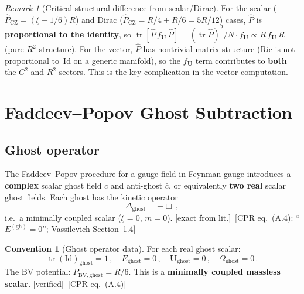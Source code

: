 \documentclass[12pt,a4paper]{article}
\theoremstyle{definition}
\newtheorem{convention}[proposition]{Convention}
\theoremstyle{remark}
\newtheorem{remark}[proposition]{Remark}
\newcommand{\tr}{\operatorname{tr}}
\newcommand{\Id}{\mathrm{Id}}
\newcommand{\fromlit}[1]{\textcolor{blue!70!black}{\textsf{[#1]}}}
\newcommand{\exactlit}{\textcolor{blue!60!black}{\textsf{[exact from lit.]}}}
\newcommand{\verified}{\textcolor{green!50!black}{\textsf{[verified]}}}
\begin{document}
\begin{remark}[Critical structural difference from scalar/Dirac]
\label{rem:matrix-hatP}
For the scalar ($\hat{P}_{\mathrm{CZ}} = (\xi+1/6)R$) and
Dirac ($\hat{P}_{\mathrm{CZ}} = R/4 + R/6 = 5R/12$) cases,
$\hat{P}$ is \textbf{proportional to the identity}, so
$\tr[\hat{P}\,f_{\mathbf{U}}\,\hat{P}] = (\tr\hat{P})^2/N \cdot
f_{\mathbf{U}} \propto R\,f_{\mathbf{U}}\,R$ (pure $R^2$ structure).
For the vector, $\hat{P}$ has nontrivial matrix structure
(Ric is not proportional to~$\Id$ on a generic manifold), so the
$f_{\mathbf{U}}$ term contributes to \textbf{both} the $C^2$ and
$R^2$ sectors.  This is the key complication in the vector computation.
\end{remark}


\section{Faddeev--Popov Ghost Subtraction}
\label{sec:ghost-subtraction}

\subsection{Ghost operator}

The Faddeev--Popov procedure for a gauge field in Feynman gauge
introduces a \textbf{complex} scalar ghost field $c$ and anti-ghost
$\bar{c}$, or equivalently \textbf{two real} scalar ghost fields.
Each ghost has the kinetic operator
\begin{equation}
  \Delta_{\mathrm{ghost}} = -\Box\,,
  \label{eq:ghost-operator}
\end{equation}
i.e.\ a minimally coupled scalar ($\xi = 0$, $m = 0$).
\exactlit\ \fromlit{CPR eq.~(A.4): ``$E^{(\mathrm{gh})} = 0$'';
Vassilevich Section~1.4}

\begin{convention}[Ghost operator data]
For each real ghost scalar:
\begin{equation}
  \tr(\Id)_{\mathrm{ghost}} = 1\,,\quad
  E_{\mathrm{ghost}} = 0\,,\quad
  \mathbf{U}_{\mathrm{ghost}} = 0\,,\quad
  \Omega_{\mathrm{ghost}} = 0\,.
  \label{eq:ghost-data}
\end{equation}
The BV potential: $P_{\mathrm{BV,ghost}} = R/6$.
This is a \textbf{minimally coupled massless scalar}.
\verified\ \fromlit{CPR eq.~(A.4)}
\end{convention}
\end{document}
